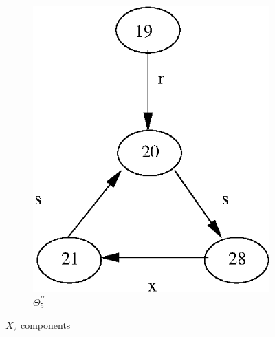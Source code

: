 \documentclass[a4paper,12pt]{article}
\numberwithin{equation}{section}
\numberwithin{figure}{section}
\begin{document}
\begin{figure}
\begin{center}
\begin{subfigure}[b]{.3\columnwidth}
\includegraphics[scale=.4]{ex_K_j4.eps}
\caption{$\Theta_5^{\prime\prime}$}
\label{fig:K_j4}
\end{subfigure}
\end{center}
\caption{$X_2$ components}
\label{fig:KY5}
\end{figure}
\end{document}
